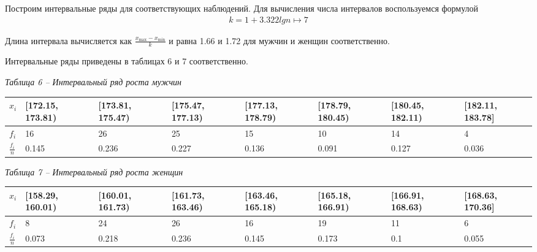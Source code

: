 Построим интервальные ряды для соответствующих наблюдений.
Для вычисления числа интервалов воспользуемся формулой
\begin{gather*}
    k = 1 + 3.322 lg n \mapsto 7
\end{gather*}

Длина интервала вычисляется как $\frac{x_{\text{max}}-x_{\text{min}}}{k}$ и равна
1.66 и 1.72 для мужчин и женщин соответственно.

Интервальные ряды приведены в таблицах 6 и 7 соответственно.

\noindent\textit{Таблица 6 -- Интервальный ряд роста мужчин}
\begin{small}
    \begin{longtable}{|p{0.5cm}|p{2cm}|p{2cm}|p{2cm}|p{2cm}|p{2cm}|p{2cm}|p{2cm}|}
        \hline
        $x_i$           & [172.15, 173.81) & [173.81, 175.47) & [175.47, 177.13) & [177.13, 178.79) & [178.79, 180.45) & [180.45, 182.11) & [182.11, 183.78] \\\hline
        $f_i$           & 16               & 26               & 25               & 15               & 10               & 14               & 4                \\\hline
        $\frac{f_i}{n}$ & 0.145            & 0.236            & 0.227            & 0.136            & 0.091            & 0.127            & 0.036            \\\hline
    \end{longtable}
\end{small}

\noindent\textit{Таблица 7 -- Интервальный ряд роста женщин}
\begin{small}
    \begin{longtable}{|p{0.5cm}|p{2cm}|p{2cm}|p{2cm}|p{2cm}|p{2cm}|p{2cm}|p{2cm}|}
        \hline
        $x_i$           & [158.29, 160.01) & [160.01, 161.73) & [161.73, 163.46) & [163.46, 165.18) & [165.18, 166.91) & [166.91, 168.63) & [168.63, 170.36] \\\hline
        $f_i$           & 8                & 24               & 26               & 16               & 19               & 11               & 6                \\\hline
        $\frac{f_i}{n}$ & 0.073            & 0.218            & 0.236            & 0.145            & 0.173            & 0.1              & 0.055            \\\hline
    \end{longtable}
\end{small}

